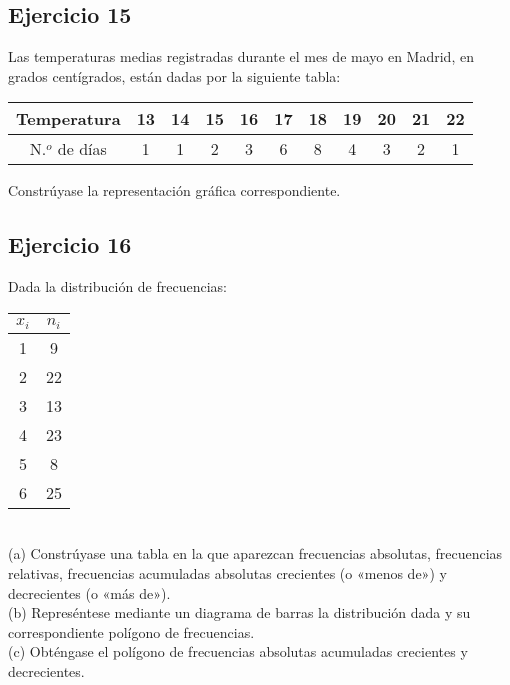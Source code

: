 \documentclass[11pt,letterpaper]{report}
\begin{document}
      \subsection*{Ejercicio 15}
        Las temperaturas medias registradas durante el mes de mayo en Madrid, en grados centígrados, están dadas por la siguiente tabla:
        \begin{table}[!h]
            \centering
            \begin{tabular}{|c|c|c|c|c|c|c|c|c|c|c|}
                \hline
                Temperatura & 13 &14& 15& 16& 17 &18& 19& 20& 21& 22  \\
                \hline
               N.$^o$ de días &1 &1 &2 &3 &6 &8 &4 &3 &2& 1   \\
                \hline
            \end{tabular}
       \end{table}

       Constrúyase la representación gráfica correspondiente.
      \subsection*{Ejercicio 16}
         Dada la distribución de frecuencias:
         \begin{table}[!h]
             \centering
             \begin{tabular}{|c|c|}
                 \hline
                 $x_i$ & $n_i$ \\
                 \hline
                 1  & 9   \\
                 \hline
                 2  & 22  \\
                 \hline
                 3  & 13  \\
                 \hline
                 4  & 23  \\
                 \hline
                 5  & 8   \\
                 \hline
                 6  & 25  \\
                 \hline
             \end{tabular}
         \end{table}
         \\
         (a) Constrúyase una tabla en la que aparezcan frecuencias absolutas, frecuencias relativas, frecuencias acumuladas absolutas crecientes (o «menos de») y decrecientes (o «más de»).\\
         (b) Represéntese mediante un diagrama de barras la distribución dada y su correspondiente polígono de frecuencias.\\
         (c) Obténgase el polígono de frecuencias absolutas acumuladas crecientes y decrecientes.\\
\end{document}
